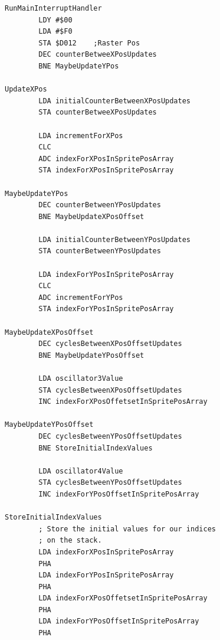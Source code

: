 \begin{minipage}[b]{0.45\linewidth}
\centering
\begin{lstlisting}[caption=Animation in Torus Demo,basicstyle=\tiny\ttfamily]
RunMainInterruptHandler   
        LDY #$00
        LDA #$F0
        STA $D012    ;Raster Pos
        DEC counterBetweeXPosUpdates
        BNE MaybeUpdateYPos

UpdateXPos
        LDA initialCounterBetweenXPosUpdates
        STA counterBetweeXPosUpdates

        LDA incrementForXPos
        CLC 
        ADC indexForXPosInSpritePosArray
        STA indexForXPosInSpritePosArray

MaybeUpdateYPos   
        DEC counterBetweenYPosUpdates
        BNE MaybeUpdateXPosOffset

        LDA initialCounterBetweenYPosUpdates
        STA counterBetweenYPosUpdates

        LDA indexForYPosInSpritePosArray
        CLC 
        ADC incrementForYPos
        STA indexForYPosInSpritePosArray

MaybeUpdateXPosOffset
        DEC cyclesBetweenXPosOffsetUpdates
        BNE MaybeUpdateYPosOffset

        LDA oscillator3Value
        STA cyclesBetweenXPosOffsetUpdates
        INC indexForXPosOffetsetInSpritePosArray

MaybeUpdateYPosOffset
        DEC cyclesBetweenYPosOffsetUpdates
        BNE StoreInitialIndexValues

        LDA oscillator4Value
        STA cyclesBetweenYPosOffsetUpdates
        INC indexForYPosOffsetInSpritePosArray

StoreInitialIndexValues   
        ; Store the initial values for our indices
        ; on the stack.
        LDA indexForXPosInSpritePosArray
        PHA 
        LDA indexForYPosInSpritePosArray
        PHA 
        LDA indexForXPosOffetsetInSpritePosArray
        PHA 
        LDA indexForYPosOffsetInSpritePosArray
        PHA 
\end{lstlisting}
\end{minipage}
\hspace{0.5cm}
